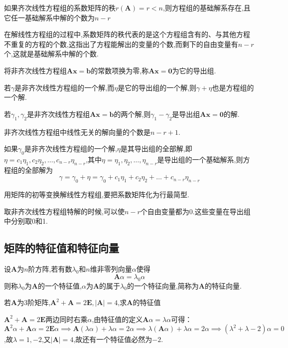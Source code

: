 \begin{ttheorem}
    如果齐次线性方程组的系数矩阵的秩$r(\mathbf{A})=r<n$,则方程组的基础解系存在,且它任一基础解系中解的个数为$n-r$
\end{ttheorem}

在解线性方程组的过程中,系数矩阵的秩代表的是这个方程组含有的、与其他方程不重复的方程的个数,这指出了方程能解出的变量的个数,而剩下的自由变量有$n-r$个,这就是基础解系中解的个数.

将非齐次线性方程组$\mathbf{Ax=b}$的常数项换为零,称$\mathbf{Ax=0}$为它的导出组.

若$\gamma$是非齐次线性方程组的一个解,而$\eta$是它的导出组的一个解,则$\gamma+\eta$也是方程组的一个解.

若$\gamma_1,\gamma_2$是非齐次线性方程组$\mathbf{Ax=b}$的两个解,则$\gamma_1-\gamma_2$是导出组$\mathbf{Ax=0}$的解.

非齐次线性方程组中线性无关的解向量的个数是$n-r+1$.

\begin{ttheorem}
    如果$\gamma_0$是非齐次线性方程组的一个解,$\eta$是其导出组的全部解,即$\eta=c_1\eta_1,c_2\eta_2,\dots,c_{n-r}\eta_{n-r}$,其中$\eta=\eta_1,\eta_2,\dots,\eta_{n-r}$是导出组的一个基础解系,则方程组的全部解为
    \begin{equation*}
        \gamma=\gamma_0+\eta=\gamma_0+c_1\eta_1+c_2\eta_2+\dots+c_{n-r}\eta_{n-r}
    \end{equation*}
\end{ttheorem}

用矩阵的初等变换解线性方程组,要把系数矩阵化为行最简型.

取非齐次线性方程组特解的时候,可以使$n-r$个自由变量都为0.这些变量在导出组中分别取0和1.

\subsection{矩阵的特征值和特征向量}
\begin{definition}
    设$\mathbf{A}$为$n$阶方阵,若有数$\lambda_0$和$n$维非零列向量$\alpha$使得
    \begin{equation*}
        \mathbf{A}\alpha=\lambda_0\alpha
    \end{equation*}
    则称$\lambda_0$为$\mathbf{A}$的一个特征值,$\alpha$为$\mathbf{A}$的属于$\lambda_0$的一个特征向量,简称为$\mathbf{A}$的特征向量.
\end{definition}

\begin{examp}{若$\mathbf{A}$为3阶矩阵,$\mathbf{A}^2+\mathbf{A}=2\mathbf{E},\left\lvert \mathbf{A}\right\rvert =4$,求$\mathbf{A}$的特征值}
    
    \jie $\mathbf{A}^2+\mathbf{A}=2\mathbf{E}$两边同时右乘$\alpha$,由特征值的定义$\mathbf{A}\alpha=\lambda\alpha$可得：$\mathbf{A}^2\alpha+\mathbf{A}\alpha=2\mathbf{E}\alpha \implies \mathbf{A}(\lambda\alpha)+\lambda\alpha=2\alpha \implies \lambda(\mathbf{A}\alpha)+\lambda\alpha=2\alpha \implies (\lambda^2+\lambda-2)\alpha=0$,故$\lambda=1,-2$,又$\left\lvert \mathbf{A}\right\rvert =4$,故还有一个特征值必然为$-2$.
\end{examp}

